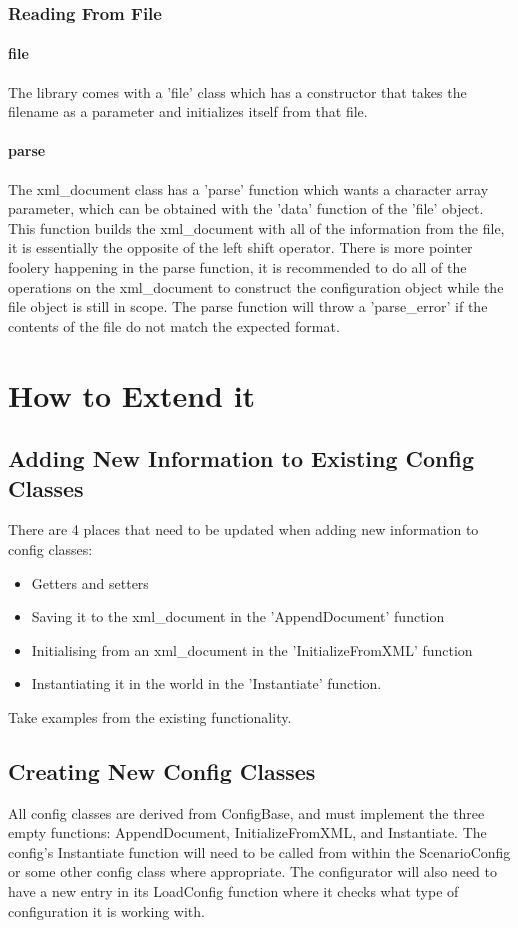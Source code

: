 \documentclass[../main.tex]{subfiles}
\begin{document}
\subsubsection{Reading From File}
\paragraph{file}
The library comes with a 'file' class which has a constructor that takes the filename as a parameter and initializes itself from that file.
\paragraph{parse}
The xml\_document class has a 'parse' function which wants a character array parameter, which can be obtained with the 'data' function of the 'file' object.
This function builds the xml\_document with all of the information from the file, it is essentially the opposite of the left shift operator.
There is more pointer foolery happening in the parse function, it is recommended to do all of the operations on the xml\_document to construct the configuration object while the file object is still in scope.
The parse function will throw a 'parse\_error' if the contents of the file do not match the expected format.

\section{How to Extend it}
\subsection{Adding New Information to Existing Config Classes}
There are 4 places that need to be updated when adding new information to config classes:
\begin{itemize}
    \item Getters and setters
    \item Saving it to the xml\_document in the 'AppendDocument' function
    \item Initialising from an xml\_document in the 'InitializeFromXML' function
    \item Instantiating it in the world in the 'Instantiate' function.
\end{itemize}
Take examples from the existing functionality.

\subsection{Creating New Config Classes}
All config classes are derived from ConfigBase, and must implement the three empty functions: AppendDocument, InitializeFromXML, and Instantiate.
The config's Instantiate function will need to be called from within the ScenarioConfig or some other config class where appropriate.
The configurator will also need to have a new entry in its LoadConfig function where it checks what type of configuration it is working with.
\end{document}
